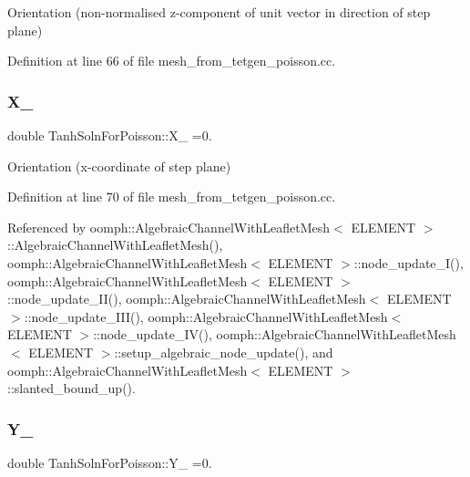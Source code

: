 Orientation (non-\/normalised z-\/component of unit vector in direction of step plane) 



Definition at line 66 of file mesh\+\_\+from\+\_\+tetgen\+\_\+poisson.\+cc.

\mbox{\label{namespaceTanhSolnForPoisson_af55e0479c15ab58929eb96ee9d6cf07a}} 
\subsubsection{\texorpdfstring{X\+\_}{X\_0}}
{\footnotesize\ttfamily double Tanh\+Soln\+For\+Poisson\+::\+X\+\_ =0.}



Orientation (x-\/coordinate of step plane) 



Definition at line 70 of file mesh\+\_\+from\+\_\+tetgen\+\_\+poisson.\+cc.



Referenced by oomph\+::\+Algebraic\+Channel\+With\+Leaflet\+Mesh$<$ E\+L\+E\+M\+E\+N\+T $>$\+::\+Algebraic\+Channel\+With\+Leaflet\+Mesh(), oomph\+::\+Algebraic\+Channel\+With\+Leaflet\+Mesh$<$ E\+L\+E\+M\+E\+N\+T $>$\+::node\+\_\+update\+\_\+\+I(), oomph\+::\+Algebraic\+Channel\+With\+Leaflet\+Mesh$<$ E\+L\+E\+M\+E\+N\+T $>$\+::node\+\_\+update\+\_\+\+I\+I(), oomph\+::\+Algebraic\+Channel\+With\+Leaflet\+Mesh$<$ E\+L\+E\+M\+E\+N\+T $>$\+::node\+\_\+update\+\_\+\+I\+I\+I(), oomph\+::\+Algebraic\+Channel\+With\+Leaflet\+Mesh$<$ E\+L\+E\+M\+E\+N\+T $>$\+::node\+\_\+update\+\_\+\+I\+V(), oomph\+::\+Algebraic\+Channel\+With\+Leaflet\+Mesh$<$ E\+L\+E\+M\+E\+N\+T $>$\+::setup\+\_\+algebraic\+\_\+node\+\_\+update(), and oomph\+::\+Algebraic\+Channel\+With\+Leaflet\+Mesh$<$ E\+L\+E\+M\+E\+N\+T $>$\+::slanted\+\_\+bound\+\_\+up().

\mbox{\label{namespaceTanhSolnForPoisson_addc6dc6578b16a1d9aa774c25776b921}} 
\subsubsection{\texorpdfstring{Y\+\_}{Y\_0}}
{\footnotesize\ttfamily double Tanh\+Soln\+For\+Poisson\+::\+Y\+\_ =0.}




